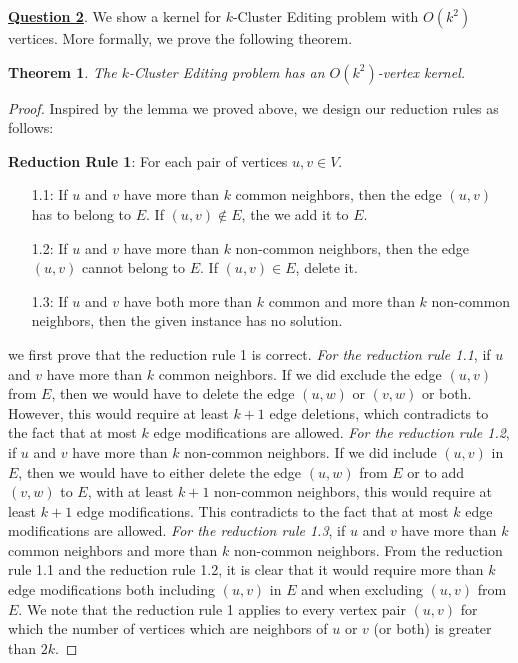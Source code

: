 \documentclass{article}
\newtheorem{theorem}{Theorem}
\begin{document}
\noindent \underline{\textbf{Question 2}}. We show a kernel for \(k\)-Cluster Editing problem with \(O(k^2)\) vertices. More formally, we prove the following theorem.

\begin{theorem}
The \(k\)-Cluster Editing problem has an \(O(k^2)\)-vertex kernel.
\end{theorem}

\begin{proof}
Inspired by the lemma we proved above, we design our reduction rules as follows:

\noindent \textbf{Reduction Rule 1}: For each pair of vertices \(u,v \in V\).
\begin{enumerate}
\item[1.1:] If \(u\) and \(v\) have more than \(k\) common neighbors, then the edge \((u,v)\) has to belong to \(E\). If \((u,v) \notin E\), the we add it to \(E\).
\item[1.2:] If \(u\) and \(v\) have more than \(k\) non-common neighbors, then the edge \((u,v)\) cannot belong to \(E\). If \((u,v) \in E\), delete it.
\item[1.3:] If \(u\) and \(v\) have both more than \(k\) common and more than \(k\) non-common neighbors, then the given instance has no solution.
\end{enumerate}

we first prove that the reduction rule 1 is correct. \textit{For the reduction rule 1.1}, if \(u\) and \(v\) have more than \(k\) common neighbors. If we did exclude the edge \((u,v)\) from \(E\), then we would have to delete the edge \((u,w)\) or \((v,w)\) or both. However, this would require at least \(k+1\) edge deletions, which contradicts to the fact that at most \(k\) edge modifications are allowed.
\textit{For the reduction rule 1.2}, if \(u\) and \(v\) have more than \(k\) non-common neighbors. If we did include \((u,v)\) in \(E\), then we would have to either delete the edge \((u,w)\) from \(E\) or to add \((v,w)\) to \(E\), with at least \(k+1\) non-common neighbors, this would require at least \(k+1\) edge modifications. This contradicts to the fact that at most \(k\) edge modifications are allowed. \textit{For the reduction rule 1.3}, if \(u\) and \(v\) have more than \(k\) common neighbors and more than \(k\) non-common neighbors. From the reduction rule 1.1 and the reduction rule 1.2, it is clear that it would require more than \(k\) edge modifications both including \((u,v)\) in \(E\) and when excluding \((u,v)\) from \(E\). We note that the reduction rule 1 applies to every vertex pair \((u,v)\) for which the number of vertices which are neighbors of \(u\) or \(v\) (or both) is greater than \(2k\).


\end{proof}
\end{document}
